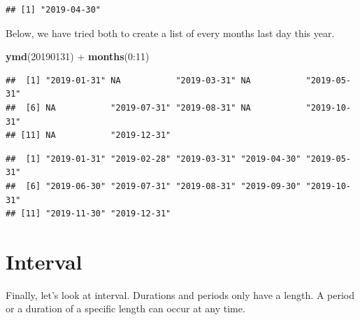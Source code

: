 \documentclass[]{tufte-book}
\newenvironment{Shaded}{}{}
\newcommand{\DecValTok}[1]{\textcolor[rgb]{0.25,0.63,0.44}{#1}}
\newcommand{\KeywordTok}[1]{\textcolor[rgb]{0.00,0.44,0.13}{\textbf{#1}}}
\newcommand{\NormalTok}[1]{#1}
\newcommand{\OperatorTok}[1]{\textcolor[rgb]{0.40,0.40,0.40}{#1}}
\newcommand{\StringTok}[1]{\textcolor[rgb]{0.25,0.44,0.63}{#1}}
\begin{document}
\begin{Shaded}
\end{Shaded}

\begin{verbatim}
## [1] "2019-04-30"
\end{verbatim}

Below, we have tried both to create a list of every months last day this year.

\begin{Shaded}
\begin{Highlighting}[]
\KeywordTok{ymd}\NormalTok{(}\DecValTok{20190131}\NormalTok{) }\OperatorTok{+}\StringTok{ }\KeywordTok{months}\NormalTok{(}\DecValTok{0}\OperatorTok{:}\DecValTok{11}\NormalTok{)}
\end{Highlighting}
\end{Shaded}

\begin{verbatim}
##  [1] "2019-01-31" NA           "2019-03-31" NA           "2019-05-31"
##  [6] NA           "2019-07-31" "2019-08-31" NA           "2019-10-31"
## [11] NA           "2019-12-31"
\end{verbatim}

\begin{Shaded}
\end{Shaded}

\begin{verbatim}
##  [1] "2019-01-31" "2019-02-28" "2019-03-31" "2019-04-30" "2019-05-31"
##  [6] "2019-06-30" "2019-07-31" "2019-08-31" "2019-09-30" "2019-10-31"
## [11] "2019-11-30" "2019-12-31"
\end{verbatim}

\hypertarget{interval-2}{%
\section{Interval}\label{interval-2}}

Finally, let's look at interval. Durations and periods only have a length. A period or a duration of a specific length can occur at any time.
\end{document}
